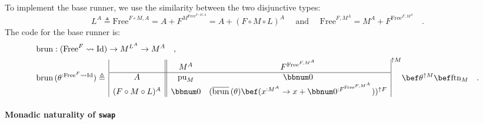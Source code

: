 To implement the base runner, we use the similarity between the two
disjunctive types:
\[
L^{A}\triangleq\text{Free}^{F\circ M,A}=A+F^{M^{\text{Free}^{F\circ M,A}}}=A+(F\circ M\circ L)^{A}\quad\text{ and }\quad\text{Free}^{F,M^{A}}=M^{A}+F^{\text{Free}^{F,M^{A}}}\quad.
\]
The code for the base runner is:
\begin{align*}
 & \text{brun}:(\text{Free}^{F}\leadsto\text{Id})\rightarrow M^{L^{A}}\rightarrow M^{A}\quad,\\
 & \text{brun}\,(\theta^{:\text{Free}^{F}\leadsto\text{Id}})\triangleq\,\begin{array}{|c||cc|}
 & M^{A} & F^{\text{Free}^{F,M^{A}}}\\
\hline A & \text{pu}_{M} & \bbnum 0\\
(F\circ M\circ L)^{A} & \bbnum 0 & (\overline{\text{brun}}\,(\theta)\bef(x^{:M^{A}}\rightarrow x+\bbnum 0^{:F^{\text{Free}^{F,M^{A}}}}))^{\uparrow F}
\end{array}^{\uparrow M}\bef\theta^{\uparrow M}\bef\text{ftn}_{M}\quad.
\end{align*}


\paragraph{Monadic naturality of \texttt{swap}}

